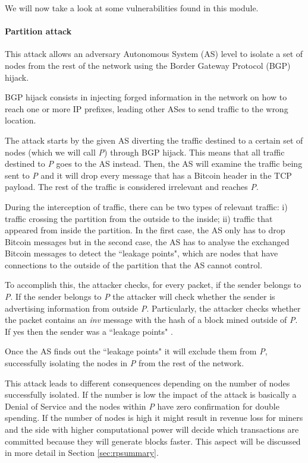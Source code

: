 We will now take a look at some vulnerabilities found in this module.

\paragraph*{Partition attack}
\label{sec:partition}
This attack allows an adversary Autonomous System (AS) level to isolate a set of nodes from the rest of the network using the Border Gateway Protocol (BGP) hijack.

BGP hijack consists in injecting forged information in the network on how to reach one or more IP prefixes, leading other ASes to send traffic to the wrong location.

The attack starts by the given AS diverting the traffic destined to a certain set of nodes (which we will call \textit{P}) through BGP hijack. This means that all traffic destined to \textit{P} goes to the AS instead. Then, the AS will examine the traffic being sent to \textit{P} and it will drop every message that has a Bitcoin header in the TCP payload. The rest of the traffic is considered irrelevant and reaches \textit{P}.

During the interception of traffic, there can be two types of relevant traffic: i) traffic crossing the partition from the outside to the inside; ii) traffic that appeared from inside the partition. In the first case, the AS only has to drop Bitcoin messages but in the second case, the AS has to analyse the exchanged Bitcoin messages to detect the ``leakage points", which are nodes that have connections to the outside of the partition that the AS cannot control.

To accomplish this, the attacker checks, for every packet, if the sender belongs to \textit{P}. If the sender belongs to \textit{P} the attacker will check whether the sender is advertising information from outside \textit{P}. Particularly, the attacker checks whether the packet contains an \textit{inv} message with the hash of a block mined outside of \textit{P}. If yes then the sender was a ``leakage points"  \cite{apostolaki2016hijacking}.

Once the AS finds out the ``leakage points" it will exclude them from \textit{P}, successfully isolating the nodes in \textit{P} from the rest of the network.

This attack leads to different consequences depending on the number of nodes successfully isolated. If the number is low the impact of the attack is basically a Denial of Service and the nodes within \textit{P} have zero confirmation for double spending. If the number of nodes is high it might result in revenue loss for miners and the side with higher computational power will decide which transactions are committed because they will generate blocks faster. This aspect will be discussed in more detail in Section \ref{sec:rpsummary}.

